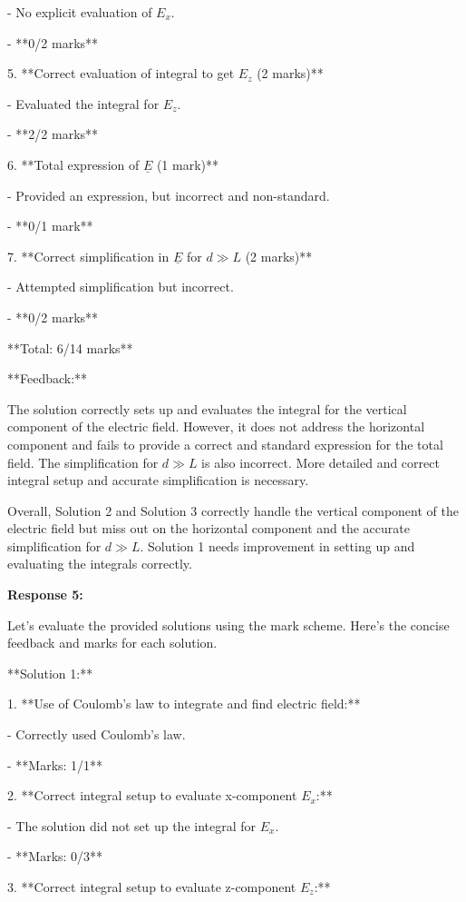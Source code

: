 \documentclass[a4paper,11pt]{article}
\begin{document}
   - No explicit evaluation of \(E_x\).
   
   - **0/2 marks**

5. **Correct evaluation of integral to get \(E_z\) (2 marks)**

   - Evaluated the integral for \(E_z\).
   
   - **2/2 marks**

6. **Total expression of \(\underline{E}\) (1 mark)**

   - Provided an expression, but incorrect and non-standard.
   
   - **0/1 mark**

7. **Correct simplification in \(\underline{E}\) for \(d \gg L\) (2 marks)**

   - Attempted simplification but incorrect.
   
   - **0/2 marks**

**Total: 6/14 marks**

**Feedback:**

The solution correctly sets up and evaluates the integral for the vertical component of the electric field. However, it does not address the horizontal component and fails to provide a correct and standard expression for the total field. The simplification for \(d \gg L\) is also incorrect. More detailed and correct integral setup and accurate simplification is necessary.

Overall, Solution 2 and Solution 3 correctly handle the vertical component of the electric field but miss out on the horizontal component and the accurate simplification for \(d \gg L\). Solution 1 needs improvement in setting up and evaluating the integrals correctly.

\bigskip
\textbf{Response 5:}

Let's evaluate the provided solutions using the mark scheme. Here's the concise feedback and marks for each solution.

**Solution 1:**

1. **Use of Coulomb's law to integrate and find electric field:**

   - Correctly used Coulomb's law.
   
   - **Marks: 1/1**

2. **Correct integral setup to evaluate x-component \(E_x\):**

   - The solution did not set up the integral for \(E_x\).
   
   - **Marks: 0/3**

3. **Correct integral setup to evaluate z-component \(E_z\):**
\end{document}
